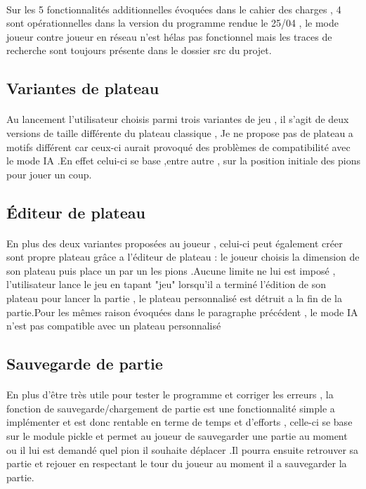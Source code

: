 \documentclass[a4paper,12pt]{article}
\begin{document}
\paragraph{}
Sur les 5 fonctionnalités additionnelles évoquées dans le cahier des charges , 4 sont opérationnelles dans la version du programme rendue le 25/04 , le mode joueur contre joueur en réseau n'est hélas pas fonctionnel mais les traces de recherche sont toujours présente dans le dossier src du projet.

\subsection{Variantes de plateau}
\paragraph{}
Au lancement l'utilisateur choisis parmi trois variantes de jeu , il s'agit de deux versions de taille différente du plateau classique , Je ne propose pas de plateau a motifs différent car ceux-ci aurait provoqué des problèmes de compatibilité avec le mode IA .En effet celui-ci se base ,entre autre , sur la position initiale des pions pour jouer un coup.

\subsection{Éditeur de plateau}
\paragraph{}
En plus des deux variantes proposées au joueur , celui-ci peut également créer sont propre plateau grâce a l'éditeur de plateau : le joueur choisis la dimension de son plateau puis place un par un les pions .Aucune limite ne lui est imposé , l'utilisateur lance le jeu en tapant "jeu" lorsqu'il a terminé l'édition de son plateau pour lancer la partie , le plateau personnalisé est détruit a la fin de la partie.Pour les mêmes raison évoquées dans le paragraphe précédent , le mode IA n'est pas compatible avec un plateau personnalisé

\subsection{Sauvegarde de partie}
\paragraph{}
En plus d'être très utile  pour tester le programme et corriger les erreurs , la fonction de sauvegarde/chargement de partie est une fonctionnalité simple a implémenter et est donc rentable en terme de temps et d'efforts , celle-ci se base sur le module pickle et permet au joueur de sauvegarder une partie au moment ou il lui est demandé quel pion il souhaite déplacer .Il pourra ensuite retrouver sa partie et rejouer en respectant le tour du joueur au moment il a sauvegarder la partie.
\end{document}

